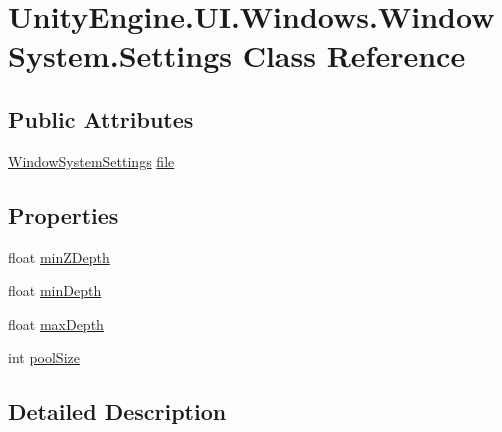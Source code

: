 \hypertarget{class_unity_engine_1_1_u_i_1_1_windows_1_1_window_system_1_1_settings}{}\section{Unity\+Engine.\+U\+I.\+Windows.\+Window\+System.\+Settings Class Reference}
\label{class_unity_engine_1_1_u_i_1_1_windows_1_1_window_system_1_1_settings}
\subsection*{Public Attributes}
\begin{DoxyCompactItemize}
\item 
\hyperlink{class_unity_engine_1_1_u_i_1_1_windows_1_1_window_system_settings}{Window\+System\+Settings} \hyperlink{class_unity_engine_1_1_u_i_1_1_windows_1_1_window_system_1_1_settings_aea20099c3aea8c1729e196b655a1521f}{file}
\end{DoxyCompactItemize}
\subsection*{Properties}
\begin{DoxyCompactItemize}
\item 
float \hyperlink{class_unity_engine_1_1_u_i_1_1_windows_1_1_window_system_1_1_settings_af39f90007a9589fd6f9f44c9e49b2e9d}{min\+Z\+Depth}
\item 
float \hyperlink{class_unity_engine_1_1_u_i_1_1_windows_1_1_window_system_1_1_settings_abf77221e5b72f781fe8ebe3c35398819}{min\+Depth}
\item 
float \hyperlink{class_unity_engine_1_1_u_i_1_1_windows_1_1_window_system_1_1_settings_a17c2e00a70a5c62a18e0a1d4f7246f9a}{max\+Depth}
\item 
int \hyperlink{class_unity_engine_1_1_u_i_1_1_windows_1_1_window_system_1_1_settings_a48cdcdd60580a21f33d114921eb0780c}{pool\+Size}
\end{DoxyCompactItemize}


\subsection{Detailed Description}



